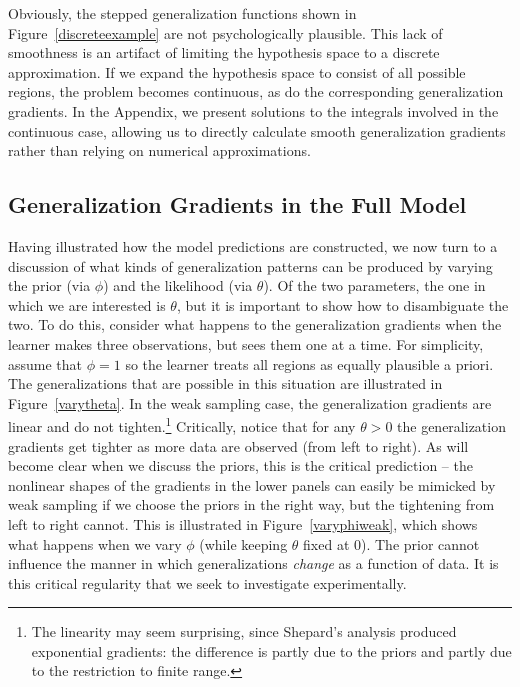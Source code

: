 \documentclass[doc]{apa6}
\begin{document}
Obviously, the stepped generalization functions shown in Figure~\ref{discreteexample} are not psychologically plausible. This lack of smoothness is an artifact of limiting the hypothesis space to a discrete approximation. If we expand the hypothesis space to consist of all possible regions, the problem becomes continuous, as do the corresponding generalization gradients. In the Appendix, we present solutions to the integrals involved in the continuous case, allowing us to directly calculate smooth generalization gradients rather than relying on numerical approximations.

\subsection{Generalization Gradients in the Full Model}

Having illustrated how the model predictions are constructed, we now turn to a discussion of what kinds of generalization patterns can be produced by varying the prior (via $\phi$) and the likelihood (via $\theta$). Of the two parameters, the one in which we are interested is $\theta$, but it is important to show how to disambiguate the two. To do this, consider what happens to the generalization gradients when the learner makes three observations, but sees them one at a time. For simplicity, assume that $\phi =1$ so the learner treats all regions as equally plausible a priori. The generalizations that are possible in this situation are illustrated in Figure~\ref{varytheta}. In the weak sampling case, the generalization gradients are linear and do not tighten.\footnote{The linearity may seem surprising, since Shepard's \citeyear{Shepard1987} analysis produced exponential gradients: the difference is partly due to the priors and partly due to the restriction to finite range.} Critically, notice that for any $\theta>0$ the generalization gradients get tighter as more data are observed (from left to right). As will become clear when we discuss the priors, this is the critical prediction -- the nonlinear shapes of the gradients in the lower panels can easily be mimicked by weak sampling if we choose the priors in the right way, but the tightening from left to right cannot. This is illustrated in Figure~\ref{varyphiweak}, which shows what happens when we vary $\phi$ (while keeping $\theta$ fixed at 0). The prior cannot influence the manner in which generalizations {\it change} as a function of data. It is this critical regularity that we seek to investigate experimentally.
\end{document}
